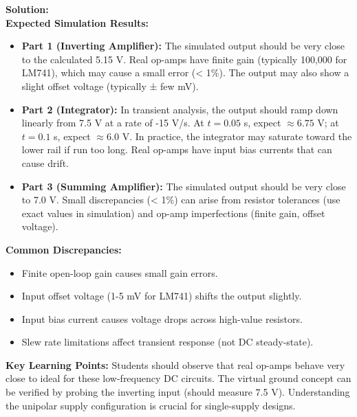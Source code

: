 \documentclass[11pt]{article}
\newenvironment{solution}
    {\color{blue}\textbf{Solution:}\\}
    {}
\begin{document}
\begin{solution}
\textbf{Expected Simulation Results:}

\begin{itemize}
    \item \textbf{Part 1 (Inverting Amplifier):} The simulated output should be very close to the calculated 5.15 V. Real op-amps have finite gain (typically 100,000 for LM741), which may cause a small error (< 1\%). The output may also show a slight offset voltage (typically ± few mV).
    
    \item \textbf{Part 2 (Integrator):} In transient analysis, the output should ramp down linearly from 7.5 V at a rate of -15 V/s. At $t = 0.05$ s, expect $\approx 6.75$ V; at $t = 0.1$ s, expect $\approx 6.0$ V. In practice, the integrator may saturate toward the lower rail if run too long. Real op-amps have input bias currents that can cause drift.
    
    \item \textbf{Part 3 (Summing Amplifier):} The simulated output should be very close to 7.0 V. Small discrepancies (< 1\%) can arise from resistor tolerances (use exact values in simulation) and op-amp imperfections (finite gain, offset voltage).
\end{itemize}

\textbf{Common Discrepancies:}
\begin{itemize}
    \item Finite open-loop gain causes small gain errors.
    \item Input offset voltage (1-5 mV for LM741) shifts the output slightly.
    \item Input bias current causes voltage drops across high-value resistors.
    \item Slew rate limitations affect transient response (not DC steady-state).
\end{itemize}

\textbf{Key Learning Points:}
Students should observe that real op-amps behave very close to ideal for these low-frequency DC circuits. The virtual ground concept can be verified by probing the inverting input (should measure 7.5 V). Understanding the unipolar supply configuration is crucial for single-supply designs.
\end{solution}
\end{document}
